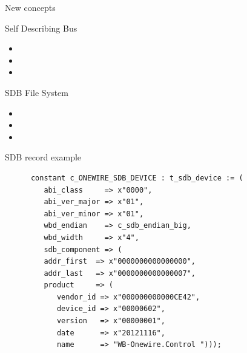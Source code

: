 \documentclass[compress,red]{beamer}
\begin{document}
\begin{frame}{New concepts}

  \begin{block}{Self Describing Bus}
    \begin{itemize}
    \item
      
    \item
      
    \item
      
    \end{itemize}
  \end{block}

  \begin{block}{SDB File System}
    \begin{itemize}
    \item
      
    \item
      
    \item
      
    \end{itemize}
  \end{block}

\end{frame}

\begin{frame}[fragile]{SDB record example}

    \begin{verbatim}
      constant c_ONEWIRE_SDB_DEVICE : t_sdb_device := (
         abi_class     => x"0000",
         abi_ver_major => x"01",
         abi_ver_minor => x"01",
         wbd_endian    => c_sdb_endian_big,
         wbd_width     => x"4",
         sdb_component => (
         addr_first  => x"0000000000000000",
         addr_last   => x"0000000000000007",
         product     => (
            vendor_id => x"000000000000CE42",
            device_id => x"00000602",
            version   => x"00000001",
            date      => x"20121116",
            name      => "WB-Onewire.Control ")));
    \end{verbatim}

\end{frame}
\end{document}
